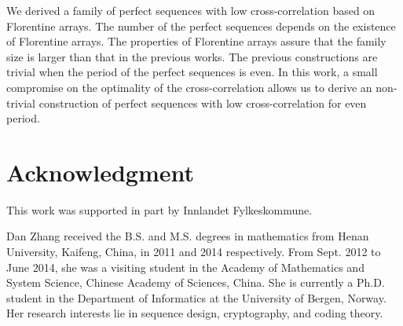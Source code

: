 \documentclass[conference,letterpaper]{IEEEtran}
\theoremstyle{definition}
\begin{document}
We derived a family of perfect sequences with low  cross-correlation based on Florentine arrays. The number of  the perfect sequences depends on the existence of  Florentine arrays. 
The properties of Florentine arrays assure that the family size is  larger than that in the previous works. 
The  previous constructions are trivial when the period of the perfect sequences is even. In this work, a small compromise on the optimality of the cross-correlation allows us to derive an non-trivial construction of perfect sequences with low cross-correlation for even period.





\section*{Acknowledgment}

This work was  supported in part by Innlandet Fylkeskommune.



\begin{IEEEbiographynophoto}{Dan Zhang}
received the B.S. and M.S. degrees in mathematics from Henan University,
Kaifeng, China, in 2011 and 2014 respectively.
From Sept. 2012 to June 2014, she was a visiting student in the Academy of Mathematics and System Science, Chinese Academy of Sciences, China. She is currently a Ph.D. student in the Department of Informatics at the University of Bergen, Norway.
Her research interests lie in sequence design, cryptography, and coding theory.
\end{IEEEbiographynophoto}
\end{document}
